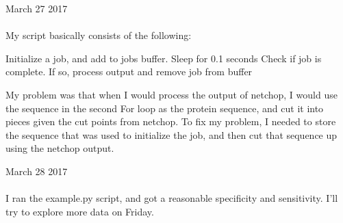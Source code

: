 \documentclass[11pt,letterpaper]{article}
\begin{document}
\begin{activityTime}
\end{activityTime}

{\Huge March 27 2017}\\[5mm]

\paragraph{} My script basically consists of the following:

\begin{algorithmic}
  Initialize a job, and add to jobs buffer.
  Sleep for 0.1 seconds
  Check if job is complete. If so, process output and remove job from buffer
  \EndFor
  \EndWhile
  \EndFor
  \EndFor
\end{algorithmic}

My problem was that when I would process the output of netchop, I would use the sequence in the second For loop as the protein sequence, and cut it into pieces given the cut points from netchop. To fix my problem, I needed to store the sequence that was used to initialize the job, and then cut that sequence up using the netchop output.

\begin{activityTime}
\end{activityTime}

{\Huge March 28 2017}\\[5mm]

\paragraph{} I ran the example.py script, and got a reasonable specificity and sensitivity. I'll try to explore more data on Friday.

\begin{activityTime}
\end{activityTime}
\end{document}
